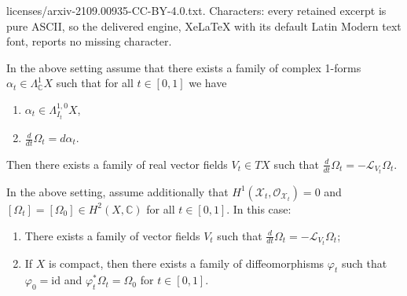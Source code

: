 \documentclass[10pt,a4paper]{amsart}
\newcommand{\LL}{\mathcal{L}}
\newcommand{\OO}{\mathcal{O}}
\newcommand{\XX}{\mathcal{X}}
\newcommand{\bbC}{\mathbb{C}}
\begin{document}
licenses/arxiv-2109.00935-CC-BY-4.0.txt. Characters: every retained excerpt is pure ASCII, so the delivered engine, XeLaTeX with its default Latin Modern text font, reports no missing character.
\begin{lem}\label{lem_v}
In the above setting assume that there exists a family of complex 1-forms
$\alpha_t\in \Lambda^1_{\bbC} X$ such that for all $t\in [0,1]$ we have
\begin{enumerate}
\item $\alpha_t\in \Lambda^{1,0}_{I_t}X$,
\item $\frac{d}{dt}{\Omega}_t = d\alpha_t$.
\end{enumerate}
Then there exists a family of real vector fields $V_t\in TX$ such
that $\frac{d}{dt}{\Omega}_t = -\LL_{V_t}\Omega_t$.
\end{lem}

\begin{thm}\label{thm_Moser_I}
In the above setting, assume additionally that
$H^1(\XX_t,\OO_{\XX_t}) = 0$ and $[\Omega_t] = [\Omega_0]\in H^2(X,\bbC)$ for all $t\in [0,1]$.
In this case:
\begin{enumerate}
\item There exists a family of vector fields $V_t$ such that $\frac{d}{dt}{\Omega}_t = -\LL_{V_t}\Omega_t$;
\item If $X$ is compact, then there exists a family of diffeomorphisms $\varphi_t$ such that
$\varphi_0 = \mathrm{id}$ and $\varphi_t^*\Omega_t = \Omega_0$ for $t\in [0,1]$.
\end{enumerate}
\end{thm}
\end{document}

